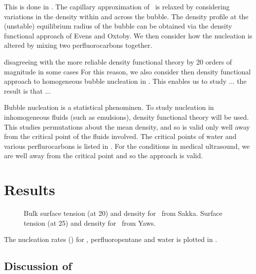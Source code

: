  This is done in .
 The capillary approximation of \cnt\ is relaxed by considering variations in the density within and across the bubble.
 The density profile at the (unstable) equilibrium radius of the bubble can be obtained via the  density functional approach of Evens and Oxtoby\cite{}.
 We then consider how the nucleation is altered by mixing two perfluorocarbons together.




 disagreeing with the more reliable density functional theory by 20 orders of magnitude in some cases\cite{Oxtoby}
 For this reason, we also 
 consider then density functional approach to homogeneous bubble nucleation in \secref{}.
 This enables us to study ...
 the result is that ...


Bubble nucleation is a statistical phenominen. 
To study nucleation in inhomogeneous fluids (such as emulsions), 
density functional theory will be used.
This studies permutations about the mean density, and so is  valid only well away from the critical point of the fluids involved.
The critical points of water and various perflurocarbons is listed in .
For the conditions in medical ultrasound, we are well away from the critical point and so the approach is valid.


\section{Results}



\begin{figure}
 \centering
  \subfloat[]{}
  \caption{
    Bulk surface tension (at 20\degreecelsius) and density  for \pfp\ from Sakka\cite{Sakka2005}.
    Surface tension (at 25\degreecelsius) and density for \pfb\ from Yaws\cite{Yaws2001}.
  }
 \label{fig:cnt:rate}
\end{figure}

The nucleation rates  (\centi\metre\rpcubed\reciprocal\second)  for \pfb,  perfluoropentane and water is plotted in .


\subsection{Discussion of  \cnt}



